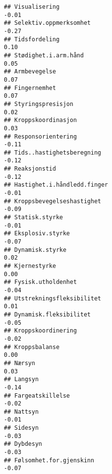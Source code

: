 \documentclass[
]{article}
\begin{document}
\begin{verbatim}
## Visualisering                                                                    -0.01
## Selektiv.oppmerksomhet                                                           -0.27
## Tidsfordeling                                                                     0.10
## Stødighet.i.arm.hånd                                                              0.05
## Armbevegelse                                                                      0.07
## Fingernemhet                                                                      0.07
## Styringspresisjon                                                                 0.02
## Kroppskoordinasjon                                                                0.03
## Responsorientering                                                               -0.11
## Tids..hastighetsberegning                                                        -0.12
## Reaksjonstid                                                                     -0.12
## Hastighet.i.håndledd.finger                                                      -0.01
## Kroppsbevegelseshastighet                                                        -0.09
## Statisk.styrke                                                                   -0.01
## Eksplosiv.styrke                                                                 -0.07
## Dynamisk.styrke                                                                   0.02
## Kjernestyrke                                                                      0.00
## Fysisk.utholdenhet                                                               -0.04
## Utstrekningsfleksibilitet                                                         0.01
## Dynamisk.fleksibilitet                                                           -0.05
## Kroppskoordinering                                                               -0.02
## Kroppsbalanse                                                                     0.00
## Nærsyn                                                                            0.03
## Langsyn                                                                          -0.14
## Fargeatskillelse                                                                 -0.02
## Nattsyn                                                                          -0.01
## Sidesyn                                                                          -0.03
## Dybdesyn                                                                         -0.03
## Følsomhet.for.gjenskinn                                                          -0.07

\end{verbatim}
\end{document}
